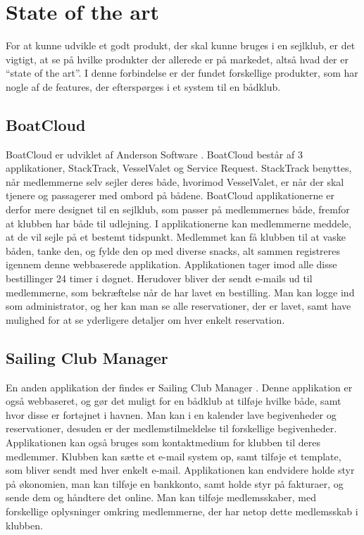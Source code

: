 \section{State of the art}\label{sec:sota}

For at kunne udvikle et godt produkt, der skal kunne bruges i en sejlklub, er det vigtigt, at se på hvilke produkter der allerede er på markedet, altså hvad der er ``state of the art''. 
I denne forbindelse er der fundet forskellige produkter, som har nogle af de features, der efterspørges i et system til en bådklub.


\subsection*{BoatCloud}

BoatCloud er udviklet af Anderson Software \citep{BoatCloud}.
BoatCloud består af 3 applikationer, StackTrack, VesselValet og Service Request.
StackTrack benyttes, når medlemmerne selv sejler deres både, hvorimod VesselValet, er når der skal tjenere og passagerer med ombord på bådene. 
BoatCloud applikationerne er derfor mere designet til en sejlklub, som passer på medlemmernes både, fremfor at klubben har både til udlejning. 
I applikationerne kan medlemmerne meddele, at de vil sejle på et bestemt tidspunkt. 
Medlemmet kan få klubben til at vaske båden, tanke den, og fylde den op med diverse snacks, alt sammen registreres igennem denne webbaserede applikation. 
Applikationen tager imod alle disse bestillinger 24 timer i døgnet. 
Herudover bliver der sendt e-mails ud til medlemmerne, som bekræftelse når de har lavet en bestilling.
Man kan logge ind som administrator, og her kan man se alle reservationer, der er lavet, samt have mulighed for at se yderligere detaljer om hver enkelt reservation.


\subsection*{Sailing Club Manager}

En anden applikation der findes er Sailing Club Manager \citep{SailClub}. 
Denne applikation er også webbaseret, og gør det muligt for en bådklub at tilføje hvilke både, samt hvor disse er fortøjnet i havnen.  
Man kan i en kalender lave begivenheder og reservationer, desuden er der medlemstilmeldelse til forskellige begivenheder. Applikationen kan også bruges som kontaktmedium for klubben til deres medlemmer. 
Klubben kan sætte et e-mail system op, samt tilføje et template, som bliver sendt med hver enkelt e-mail.
Applikationen kan endvidere holde styr på økonomien, man kan tilføje en bankkonto, samt holde styr på fakturaer, og sende dem og håndtere det online. 
Man kan tilføje medlemsskaber, med forskellige oplysninger omkring medlemmerne, der har netop dette medlemsskab i klubben.

